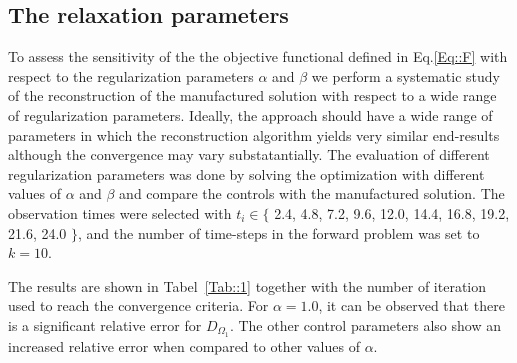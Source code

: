 \documentclass[11pt,a4paper]{article}
\begin{document}
\subsection{The relaxation parameters}
To assess the sensitivity of the the objective functional defined in Eq.\ref{Eq::F} with respect to the regularization parameters $\alpha$ and $\beta$ 
we perform a systematic study of the reconstruction of the manufactured solution with respect to a wide range of regularization parameters. 
Ideally, the approach should have a wide range of parameters in which the reconstruction algorithm yields very similar end-results although
the convergence may vary substatantially.
 The evaluation of different regularization parameters was done by solving the optimization with different values of $\alpha$ and $\beta$ and compare the controls with the manufactured solution. The observation times were selected with $t_i \in  \lbrace$ 2.4, 4.8, 7.2, 9.6, 12.0, 14.4, 16.8, 19.2, 21.6, 24.0 $\rbrace$, and the number of time-steps in the forward problem was set to $k= 10$. 

The results are shown in Tabel~\ref{Tab::1} together with the number of iteration used to reach the convergence criteria. For $\alpha= 1.0$, it can be observed that there is a significant relative error for $D_{\Omega_1}$. The other control parameters also show an increased relative error when compared to other values of $\alpha$. 
\end{document}
